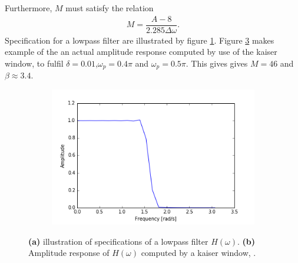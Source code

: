 Furthermore, $M$ must satisfy the relation
\begin{align}
M = \dfrac{A-8}{2.285\Delta \omega}.
\end{align}
Specification for a lowpass filter are illustrated by figure \ref{fig:kaiser_spec}. Figure  \ref{fig:kaiser_H} makes example of the an actual amplitude response computed by use of the kaiser window, to fulfil $\delta=0.01$,$\omega_p = 0.4\pi$ and $\omega_p = 0.5\pi$. This gives gives $M=46$ and $\beta \approx 3.4$.        
\begin{figure}[H]
\centering
\begin{subfigure}{0.49\textwidth}
\centering
{}
\caption{}
\label{fig:kaiser_spec}
\end{subfigure}
\begin{subfigure}{0.49\textwidth}
\centering
\includegraphics[width=\textwidth]{figures/filter_teori/kaiser_H.png}
\caption{}
\label{fig:kaiser_H}
\end{subfigure}
\caption{\textbf{(a)} illustration of specifications of a lowpass filter $H(\omega)$. \textbf{(b)} Amplitude response of $H(\omega)$ computed by a kaiser window,   .}
\end{figure}
